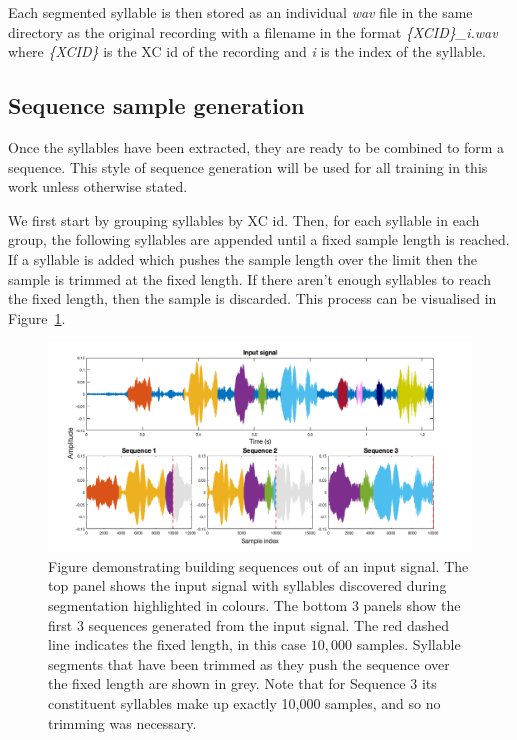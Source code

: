 Each segmented syllable is then stored as an individual \textit{wav} file in the
same directory as the original recording with a filename in the format
\textit{\{XCID\}\_i.wav} where \textit{\{XCID\}} is the XC id of the recording and
\textit{i} is the index of the syllable.

\subsection{Sequence sample generation}\label{ssec:sequence_gen}

Once the syllables have been extracted, they are ready to be combined to form a
sequence. This style of sequence generation will be used for all training in
this work unless otherwise stated.

We first start by grouping syllables by XC id. Then, for each syllable
in each group, the following syllables are appended until a fixed sample length
is reached. If a syllable is added which pushes the sample length over the
limit then the sample is trimmed at the fixed length. If there aren't enough
syllables to reach the fixed length, then the sample is discarded. This process
can be visualised in Figure~\ref{fig:sequence_building}.

\begin{figure}[ht]
  \centering
  \includegraphics[width=\textwidth]{figures/sequence_building_2.png}
  \caption{Figure demonstrating building sequences out of an input signal. The
    top panel shows the input signal with syllables discovered during
    segmentation highlighted in colours. The bottom 3 panels show the first 3
    sequences generated from the input signal. The red dashed line indicates the
    fixed length, in this case $10,000$ samples. Syllable segments that have
    been trimmed as they push the sequence over the fixed length are shown in
    grey. Note that for Sequence 3 its constituent syllables make up exactly
    10,000 samples, and so no trimming was
  necessary.}\label{fig:sequence_building}
\end{figure}

